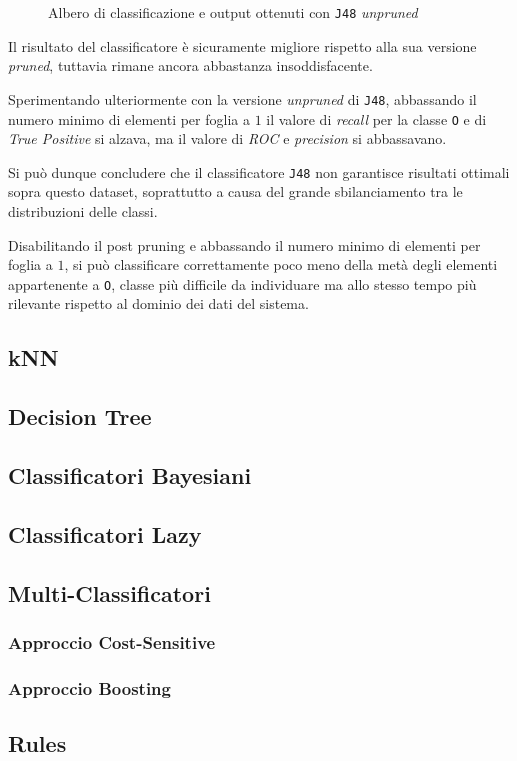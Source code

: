 \documentclass[a4paper,11pt,twoside,notitlepage,final]{scrartcl}
\begin{document}
\begin{figure}[H]
  \centering
  \caption{Albero di classificazione e output ottenuti con \texttt{J48} \emph{unpruned}}%
  \label{fig:j48}
\end{figure}


Il risultato del classificatore è sicuramente migliore rispetto alla sua versione \emph{pruned}, tuttavia rimane ancora abbastanza insoddisfacente.

Sperimentando ulteriormente con la versione \emph{unpruned} di \texttt{J48},
abbassando il numero minimo di elementi per foglia a \(1\) il valore di \emph{recall} per la classe \texttt{O} e di \emph{True Positive} si alzava,
ma il valore di \emph{ROC} e \emph{precision} si abbassavano.

Si può dunque concludere che il classificatore \texttt{J48} non garantisce risultati ottimali sopra questo dataset, soprattutto a causa del grande sbilanciamento tra le distribuzioni delle classi.

Disabilitando il post pruning e abbassando il numero minimo di elementi per foglia a \(1\), si può classificare correttamente poco meno della metà degli elementi appartenente a \texttt{O},
classe più difficile da individuare ma allo stesso tempo più rilevante rispetto al dominio dei dati del sistema.

\subsection{kNN}
\subsection{Decision Tree}
\subsection{Classificatori Bayesiani}
\subsection{Classificatori Lazy}
\subsection{Multi-Classificatori}
\subsubsection{Approccio Cost-Sensitive}
\subsubsection{Approccio Boosting}
\subsection{Rules}
\end{document}

